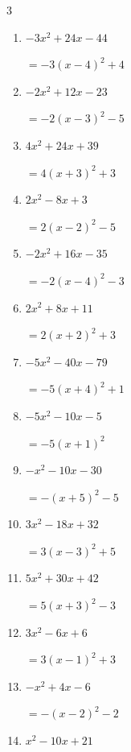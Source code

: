 \begin{multicols}{3}
\begin{enumerate}
        $=-4\left( x-5\right)^{2}+1$

  \item $-3x^{2}+24x-44$

        $=-3\left( x-4\right)^{2}+4$

  \item $-2x^{2}+12x-23$

        $=-2\left( x-3\right)^{2}-5$

  \item $4x^{2}+24x+39$

        $=4\left( x+3\right)^{2}+3$

  \item $2x^{2}-8x+3$

        $=2\left( x-2\right)^{2}-5$

  \item $-2x^{2}+16x-35$

        $=-2\left( x-4\right)^{2}-3$

  \item $2x^{2}+8x+11$

        $=2\left( x+2\right)^{2}+3$

\columnbreak %

\resetques

  \item $-5x^{2}-40x-79$

        $=-5\left( x+4\right)^{2}+1$

  \item $-5x^{2}-10x-5$

        $=-5\left( x+1\right)^{2}$

  \item $-x^{2}-10x-30$

        $=-\left( x+5\right)^{2}-5$

  \item $3x^{2}-18x+32$

        $=3\left( x-3\right)^{2}+5$

  \item $5x^{2}+30x+42$

        $=5\left( x+3\right)^{2}-3$

  \item $3x^{2}-6x+6$

        $=3\left( x-1\right)^{2}+3$

  \item $-x^{2}+4x-6$

        $=-\left( x-2\right)^{2}-2$

  \item $x^{2}-10x+21$


\end{enumerate}
\end{multicols}
